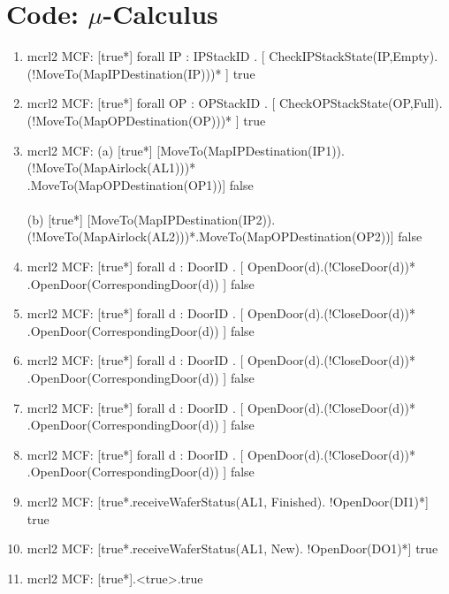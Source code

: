 \documentclass[a4paper,12pt]{article}
\begin{document}
\section{Code: $\mu$-Calculus}
\begin{enumerate}

\item mcrl2 MCF: [true*] forall IP : IPStackID . [ CheckIPStackState(IP,Empty).
\\(!MoveTo(MapIPDestination(IP)))* ] true

\item mcrl2 MCF: [true*] forall OP : OPStackID . [ CheckOPStackState(OP,Full).
\\(!MoveTo(MapOPDestination(OP)))* ] true


\item mcrl2 MCF: (a) [true*] [MoveTo(MapIPDestination(IP1)). (!MoveTo(MapAirlock(AL1)))*
\\.MoveTo(MapOPDestination(OP1))] false
\\
\\ (b) [true*] [MoveTo(MapIPDestination(IP2)). (!MoveTo(MapAirlock(AL2)))*.MoveTo(MapOPDestination(OP2))] false




\item mcrl2 MCF: [true*] forall d : DoorID . [ OpenDoor(d).(!CloseDoor(d))*
\\.OpenDoor(CorrespondingDoor(d)) ] false

\item mcrl2 MCF: [true*] forall d : DoorID . [ OpenDoor(d).(!CloseDoor(d))*
\\.OpenDoor(CorrespondingDoor(d)) ] false

\item mcrl2 MCF: [true*] forall d : DoorID . [ OpenDoor(d).(!CloseDoor(d))*
\\.OpenDoor(CorrespondingDoor(d)) ] false

\item mcrl2 MCF: [true*] forall d : DoorID . [ OpenDoor(d).(!CloseDoor(d))*
\\.OpenDoor(CorrespondingDoor(d)) ] false

\item mcrl2 MCF: [true*] forall d : DoorID . [ OpenDoor(d).(!CloseDoor(d))*
\\.OpenDoor(CorrespondingDoor(d)) ] false

\item mcrl2 MCF: [true*.receiveWaferStatus(AL1, Finished). !OpenDoor(DI1)*] true


\item mcrl2 MCF: [true*.receiveWaferStatus(AL1, New). !OpenDoor(DO1)*] true

\item mcrl2 MCF: [true*].<true>.true

\end{enumerate}
\end{document}

